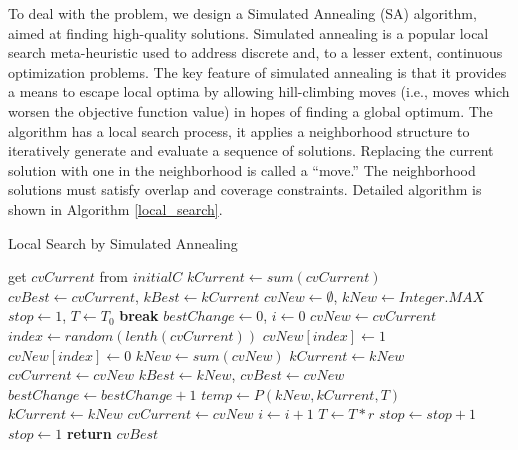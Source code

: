 To deal with the problem, we design a Simulated Annealing (SA) 
algorithm, aimed at finding high-quality solutions. 
Simulated annealing is a popular local search meta-heuristic used to address discrete and, to a lesser extent, continuous optimization problems.
The key feature of simulated annealing is that it provides a means to escape local optima by allowing hill-climbing moves (i.e., moves which worsen the objective function value) in hopes of finding a global
optimum\cite{henderson2003theory}.
The algorithm has a local search process, it applies a neighborhood
structure to iteratively generate and evaluate a sequence of solutions.
Replacing the current solution with one in the neighborhood is
called a ``move.'' The neighborhood solutions must  
satisfy overlap and coverage constraints.
Detailed algorithm is shown in Algorithm \ref{local_search}.

\begin{algorithm}[th]
\caption{Local Search by Simulated Annealing}
\label{local_search}
\begin{algorithmic}[1]
{}
\State get $cvCurrent$ from $initialC$
\State $kCurrent \leftarrow sum(cvCurrent)$
\State $cvBest \leftarrow cvCurrent$, $kBest  \leftarrow kCurrent$
\State $cvNew \leftarrow \emptyset$, $kNew \leftarrow Integer.MAX$
\State $stop \leftarrow 1$, $T \leftarrow T_0$
\State \textbf{break}
\EndIf
\State $bestChange \leftarrow 0$, $i \leftarrow 0$
\Repeat
\State $cvNew \leftarrow cvCurrent$
\State $index \leftarrow random(lenth(cvCurrent))$
\State $cvNew[index] \leftarrow 1$
\Else
\State $cvNew[index] \leftarrow 0$
\EndIf
{}
\State $kNew \leftarrow sum(cvNew)$
\State $kCurrent \leftarrow kNew$
\State $cvCurrent \leftarrow cvNew$
\State $kBest \leftarrow kNew$, $cvBest \leftarrow cvNew$
\State $bestChange \leftarrow bestChange+1$
\EndIf
\Else
\State $temp \leftarrow P(kNew,kCurrent,T)$
\State $kCurrent \leftarrow kNew$
\State $cvCurrent \leftarrow cvNew$
\EndIf
\EndIf
\State $i \leftarrow i+1$
\EndWhile
\State $T \leftarrow T*r$
\State $stop \leftarrow stop+1$
\Else
\State $stop \leftarrow 1$
\EndIf
\EndWhile
\State \textbf{return} $cvBest$
\EndFunction
\end{algorithmic}
\end{algorithm}

